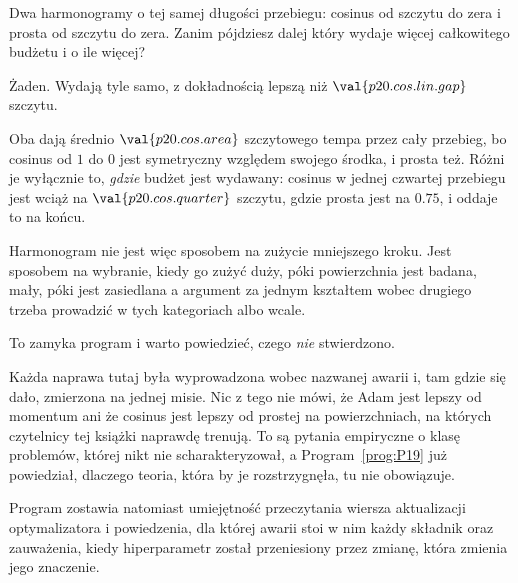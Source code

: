 \begin{fr}
Dwa harmonogramy o tej samej długości przebiegu: cosinus od szczytu do zera i
prosta od szczytu do zera. Zanim pójdziesz dalej \dash{} który wydaje więcej
całkowitego budżetu i o ile więcej?
\nextframe
\end{fr}

\begin{fr}
\begin{ansblock}
Żaden. Wydają tyle samo, z dokładnością lepszą niż $\val{p20.cos.lin.gap}$
szczytu.
\end{ansblock}

Oba dają średnio $\val{p20.cos.area}$ szczytowego tempa przez cały przebieg, bo
cosinus od $1$ do $0$ jest symetryczny względem swojego środka, i prosta też.
Różni je wyłącznie to, \emph{gdzie} budżet jest wydawany: cosinus w jednej
czwartej przebiegu jest wciąż na $\val{p20.cos.quarter}$ szczytu, gdzie prosta
jest na $\num{0.75}$, i oddaje to na końcu.

Harmonogram nie jest więc sposobem na zużycie mniejszego kroku. Jest sposobem
na wybranie, kiedy go zużyć \dash{} duży, póki powierzchnia jest badana, mały,
póki jest zasiedlana \dash{} a argument za jednym kształtem wobec drugiego
trzeba prowadzić w tych kategoriach albo wcale.
\end{fr}

\begin{fr}
To zamyka program i warto powiedzieć, czego \emph{nie} stwierdzono.

Każda naprawa tutaj była wyprowadzona wobec nazwanej awarii i, tam gdzie się
dało, zmierzona na jednej misie. Nic z tego nie mówi, że Adam jest lepszy od
momentum ani że cosinus jest lepszy od prostej na powierzchniach, na których
czytelnicy tej książki naprawdę trenują. To są pytania empiryczne o klasę
problemów, której nikt nie scharakteryzował, a Program~\ref{prog:P19} już
powiedział, dlaczego teoria, która by je rozstrzygnęła, tu nie obowiązuje.

Program zostawia natomiast umiejętność przeczytania wiersza aktualizacji
optymalizatora i powiedzenia, dla której awarii stoi w nim każdy składnik
\dash{} oraz zauważenia, kiedy hiperparametr został przeniesiony przez zmianę,
która zmienia jego znaczenie.
\end{fr}

